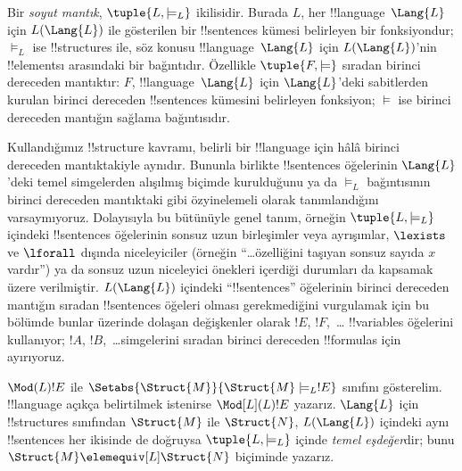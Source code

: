 \documentclass[../../../include/open-logic-section]{subfiles}
\begin{document}

\begin{defn}
Bir \emph{soyut mantık}, $\tuple{L, \models_L}$ ikilisidir. Burada $L$,
her !!{language}~$\Lang{L}$ için $L(\Lang{L})$ ile gösterilen bir
!!{sentence}s kümesi belirleyen bir fonksiyondur; $\models_L$ ise
!!{structure}s ile, söz konusu !!{language}~$\Lang{L}$ için
$L(\Lang{L})$'nin !!{element}s{}ı arasındaki bir bağıntıdır. Özellikle $\tuple{F, \models}$
sıradan birinci dereceden mantıktır: $F$, !!{language}~$\Lang{L}$ için
$\Lang{L}$'deki sabitlerden kurulan birinci dereceden !!{sentence}s
kümesini belirleyen fonksiyon; $\models$ ise birinci dereceden mantığın
sağlama bağıntısıdır.
\end{defn}

Kullandığımız !!{structure} kavramı, belirli bir !!{language} için hâlâ
birinci dereceden mantıktakiyle aynıdır. Bununla birlikte !!{sentence}s
öğelerinin $\Lang{L}$'deki temel simgelerden alışılmış biçimde kurulduğunu
ya da $\models_L$ bağıntısının birinci dereceden mantıktaki gibi özyinelemeli
olarak tanımlandığını varsaymıyoruz. Dolayısıyla bu bütünüyle genel tanım,
örneğin $\tuple{L,\models_L}$ içindeki !!{sentence}s öğelerinin sonsuz uzun
birleşimler veya ayrışımlar, $\lexists$ ve $\lforall$ dışında niceleyiciler
(örneğin ``\dots özelliğini taşıyan sonsuz sayıda $x$ vardır'') ya da sonsuz
uzun niceleyici önekleri içerdiği durumları da kapsamak üzere verilmiştir.
$L(\Lang{L})$ içindeki ``!!{sentence}s'' öğelerinin birinci dereceden
mantığın sıradan !!{sentence}s öğeleri olması gerekmediğini vurgulamak için
bu bölümde bunlar üzerinde dolaşan değişkenler olarak $!E$, $!F$,~\dots
!!{variable}s öğelerini kullanıyor; $!A$, $!B$,~\dots simgelerini sıradan
birinci dereceden !!{formula}s için ayırıyoruz.

\begin{defn}
$\Mod(L){!E}$ ile $\Setabs{\Struct{M}}{\Struct{M} \models_L !E}$ sınıfını
gösterelim. !!{language} açıkça belirtilmek istenirse $\Mod[L](L){!E}$
yazarız. $\Lang{L}$ için !!{structure}s sınıfından $\Struct{M}$ ile
$\Struct{N}$,
$L(\Lang{L})$ içindeki aynı !!{sentence}s her ikisinde de doğruysa
$\tuple{L, \models_L}$ içinde \emph{temel eşdeğer}dir; bunu
$\Struct{M} \elemequiv[L] \Struct{N}$ biçiminde yazarız.
\end{defn}
\end{document}
